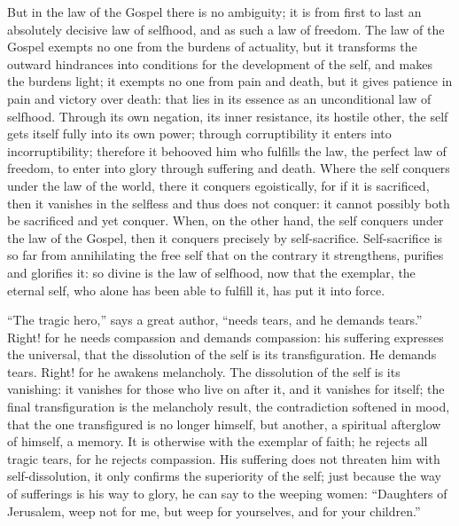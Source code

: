 \documentclass[12pt]{book}
\newcommand{\opage}[1]{\marginnote{\footnotesize\textit{[#1]}}}
\begin{document}
But in the law of the Gospel there is no ambiguity; it is from first to
last an absolutely decisive law of selfhood, and as such a law of
freedom. The law of the Gospel exempts no one from the burdens of
actuality, but it transforms the outward hindrances into conditions for
the development of the self, and makes the burdens light; it exempts no
one from pain and death, but it gives patience in pain and victory over
death: that lies in its essence as an unconditional law of selfhood.
Through its own negation, its inner resistance, its hostile other, the
self gets itself fully into its own power; through corruptibility it
enters into incorruptibility; therefore it behooved him who fulfills the
law, the perfect law of freedom, to enter into glory through suffering
and death. Where the self conquers under the law of the world, there it
conquers egoistically, for if it is sacrificed, then it vanishes in the
selfless and thus does not conquer: it cannot possibly both be
sacrificed and yet conquer. When, on the other hand, the self conquers
under the law of the Gospel, then it conquers precisely by
self-sacrifice. Self-sacrifice is so far from annihilating the free self
that on the contrary it strengthens, purifies and glorifies it: so
divine is the law of selfhood, now that the exemplar, the eternal self,
who alone has been able to fulfill it, has put it into force.

``The tragic hero,'' says a great author, ``needs tears, and he demands
tears.'' Right! for he needs compassion and demands compassion: his
suffering expresses the universal, that the dissolution of the self is
its transfiguration. He demands tears. Right! for he awakens melancholy.
The dissolution of the self is its vanishing: it vanishes for those who
live on after it, and it vanishes for itself; the final transfiguration
is the melancholy result,
\opage{46}\setcounter{footnote}{0}%
the contradiction softened in mood, that the one transfigured is no
longer himself, but another, a spiritual afterglow of himself, a memory.
It is otherwise with the exemplar of faith; he rejects all tragic tears,
for he rejects compassion. His suffering does not threaten him with
self-dissolution, it only confirms the superiority of the self; just
because the way of sufferings is his way to glory, he can say to the
weeping women: ``Daughters of Jerusalem, weep not for me, but weep for
yourselves, and for your children.''
\end{document}
